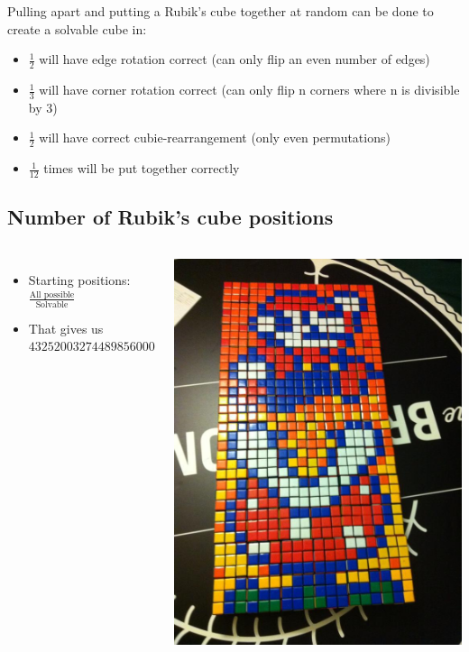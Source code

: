 \documentclass[xcolor=pdftex,dvipsnames,table]{beamer}
\begin{document}
\begin{frame}
  Pulling apart and putting a Rubik's cube together at random can be done to create a solvable cube in:
  \begin{itemize}
    \item $\frac{1}{2}$ will have edge rotation correct (can only flip an even number of edges)
    \item $\frac{1}{3}$ will have corner rotation correct (can only flip n corners where n is divisible by 3)
    \item $\frac{1}{2}$ will have correct cubie-rearrangement (only even permutations)
    \item $\frac{1}{12}$ times will be put together correctly
    \end{itemize}
\end{frame}

\subsection{Number of Rubik's cube positions}
\begin{frame}
  \begin{columns}[cc]
    \column{1.5in}
  \begin{itemize}
    \item Starting positions: $\frac{\text{All possible}}{\text{Solvable}}$
    \item That gives us $43252003274489856000$
  \end{itemize}
  \column{1.5in}
    \includegraphics[scale=0.2]{supermario.jpg}
  \end{columns}
\end{frame}
\end{document}
